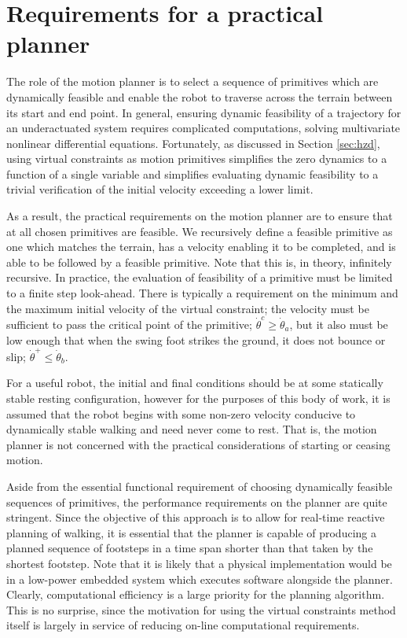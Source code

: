 \section{Requirements for a practical planner}
The role of the motion planner is to select a sequence of primitives which are dynamically feasible and enable the robot to traverse across the terrain between its start and end point. In general, ensuring dynamic feasibility of a trajectory for an underactuated system requires complicated computations, solving multivariate nonlinear differential equations. Fortunately, as discussed in Section \ref{sec:hzd}, using virtual constraints as motion primitives simplifies the zero dynamics to a function of a single variable and simplifies evaluating dynamic feasibility to a trivial verification of the initial velocity exceeding a lower limit.

As a result, the practical requirements on the motion planner are to ensure that at all chosen primitives are feasible. We recursively define a feasible primitive as one which matches the terrain, has a velocity enabling it to be completed, and is able to be followed by a feasible primitive. Note that this is, in theory, infinitely recursive. In practice, the evaluation of feasibility of a primitive must be limited to a finite step look-ahead. There is typically a requirement on the minimum and the maximum initial velocity of the virtual constraint; the velocity must be sufficient to pass the critical point of the primitive; $\dot{\theta}^c \geq \dot{\theta}_a$, but it also must be low enough that when the swing foot strikes the ground, it does not bounce or slip; $\dot{\theta}^+ \leq \dot{\theta}_b$.

For a useful robot, the initial and final conditions should be at some statically stable resting configuration, however for the purposes of this body of work, it is assumed that the robot begins with some non-zero velocity conducive to dynamically stable walking and need never come to rest. That is, the motion planner is not concerned with the practical considerations of starting or ceasing motion.

Aside from the essential functional requirement of choosing dynamically feasible sequences of primitives, the performance requirements on the planner are quite stringent. Since the objective of this approach is to allow for real-time reactive planning of walking, it is essential that the planner is capable of producing a planned sequence of footsteps in a time span shorter than that taken by the shortest footstep. Note that it is likely that a physical implementation would be in a low-power embedded system which executes software alongside the planner. Clearly, computational efficiency is a large priority for the planning algorithm. This is no surprise, since the motivation for using the virtual constraints method itself is largely in service of reducing on-line computational requirements.

